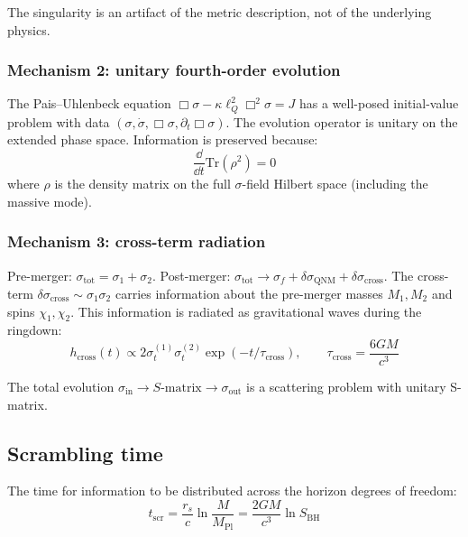 \documentclass[11pt,a4paper]{article}
\theoremstyle{plain}
\theoremstyle{definition}
\theoremstyle{remark}
\newcommand{\lQ}{\ell_Q}
\newcommand{\Mpl}{M_{\mathrm{Pl}}}
\newcommand{\sig}[2]{\sigma_{#1}^{(#2)}}
\begin{document}
The singularity is an artifact of the metric description, not of the underlying physics.

\subsubsection{Mechanism 2: unitary fourth-order evolution}

The Pais--Uhlenbeck equation $\Box\sigma - \kappa\lQ^2\Box^2\sigma = J$ has a well-posed initial-value problem with data $(\sigma, \dot\sigma, \Box\sigma, \partial_t\Box\sigma)$.  The evolution operator is unitary on the extended phase space.  Information is preserved because:
\begin{equation}
  \frac{\dd}{\dd t}\mathrm{Tr}(\rho^2) = 0
\end{equation}
where $\rho$ is the density matrix on the full $\sigma$-field Hilbert space (including the massive mode).

\subsubsection{Mechanism 3: cross-term radiation}

Pre-merger: $\sigma_{\mathrm{tot}} = \sigma_1 + \sigma_2$.  Post-merger: $\sigma_{\mathrm{tot}} \to \sigma_f + \delta\sigma_{\mathrm{QNM}} + \delta\sigma_{\mathrm{cross}}$.  The cross-term $\delta\sigma_{\mathrm{cross}} \sim \sigma_1\sigma_2$ carries information about the pre-merger masses $M_1, M_2$ and spins $\chi_1, \chi_2$.  This information is radiated as gravitational waves during the ringdown:
\begin{equation}
  h_{\mathrm{cross}}(t) \propto 2\sig{t}{1}\sig{t}{2}\exp(-t/\tau_{\mathrm{cross}}), \qquad \tau_{\mathrm{cross}} = \frac{6GM}{c^3}
\end{equation}

The total evolution $\sigma_{\mathrm{in}} \to S\text{-matrix} \to \sigma_{\mathrm{out}}$ is a scattering problem with unitary S-matrix.

\subsection{Scrambling time}

The time for information to be distributed across the horizon degrees of freedom:
\begin{equation}
  t_{\mathrm{scr}} = \frac{r_s}{c}\ln\frac{M}{\Mpl} = \frac{2GM}{c^3}\ln S_{\mathrm{BH}}
\end{equation}
\end{document}
